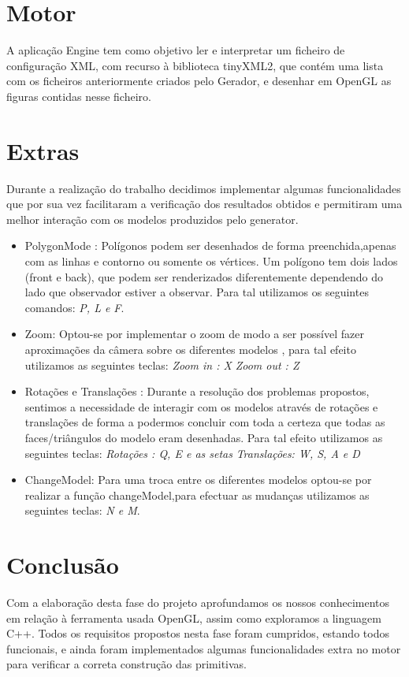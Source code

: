 \documentclass[12pt]{article}
\begin{document}
\section{Motor}
A aplicação Engine tem como objetivo ler e interpretar um ficheiro de configuração XML, com recurso à biblioteca tinyXML2, que contém uma lista
com os ficheiros anteriormente criados pelo Gerador, e desenhar em OpenGL as figuras contidas nesse ficheiro.
\begin{center}
\end{center}
\section{Extras}
Durante a realização do trabalho decidimos implementar algumas funcionalidades que por sua vez facilitaram a verificação dos resultados obtidos e permitiram uma melhor interação com os modelos produzidos pelo generator. 
\begin{itemize}
\item PolygonMode : Polígonos podem ser desenhados de forma preenchida,apenas com as linhas e contorno ou
somente os vértices. Um polígono tem dois lados (front e back), que podem ser renderizados diferentemente dependendo do lado que observador estiver a observar. Para tal utilizamos os seguintes comandos:
\textit{P, L e F}.
\item Zoom: Optou-se por implementar o zoom de modo a ser possível fazer aproximações da câmera sobre os diferentes modelos , para tal efeito utilizamos as seguintes teclas:\newline
\textit{Zoom in :  X}\newline
\textit{Zoom out :  Z}
\item Rotações e Translações : Durante a resolução dos problemas propostos, sentimos a necessidade de
interagir com os modelos através de rotações e translações de forma a podermos concluir com toda a
certeza que todas as faces/triângulos do modelo eram desenhadas. Para tal efeito utilizamos as seguintes teclas:\newline
\textit{Rotações : Q, E e as setas}\newline
\textit{Translações: W, S, A e D}
\item ChangeModel: Para uma troca entre os diferentes modelos optou-se por realizar
a função changeModel,para efectuar as mudanças utilizamos as seguintes teclas: \textit{N e M}.
\end{itemize}
\newpage
\section{Conclusão}
Com a elaboração desta fase do projeto aprofundamos os nossos conhecimentos em relação à ferramenta usada OpenGL, assim como exploramos a linguagem C++.
Todos os requisitos propostos nesta fase foram cumpridos, estando todos funcionais, e ainda foram implementados algumas funcionalidades extra no motor para
verificar a correta construção das primitivas. 
\end{document}

